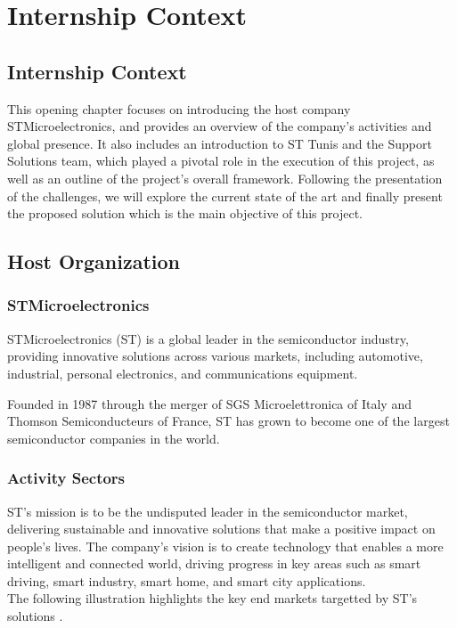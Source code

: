 \chapter{Internship Context}
\label{chap:premierchapitre}
\section*{Internship Context}
This opening chapter focuses on introducing the host company STMicroelectronics, and provides an overview of the company's activities and global presence. It also includes an introduction to ST Tunis and the Support Solutions team, which played a pivotal role in the execution of this project, as well as an outline of the project's overall framework. Following the presentation of the challenges, we will explore the current state of the art and finally present the proposed solution which is the main objective of this project.

\section{Host Organization}
\subsection{STMicroelectronics}

STMicroelectronics (ST) is a global leader in the semiconductor industry, providing innovative solutions across various markets, including automotive, industrial, personal electronics, and communications equipment.

Founded in 1987 through the merger of SGS Microelettronica of Italy and Thomson Semiconducteurs of France, ST has grown to become one of the largest semiconductor companies in the world.

\subsection{Activity Sectors}

ST's mission is to be the undisputed leader in the semiconductor market, delivering sustainable and innovative solutions that make a positive impact on people's lives. The company's vision is to create technology that enables a more intelligent and connected world, driving progress in key areas such as smart driving, smart industry, smart home, and smart city applications.\\
The following illustration highlights the key end markets targetted by ST's solutions \cite{st_comp}.

